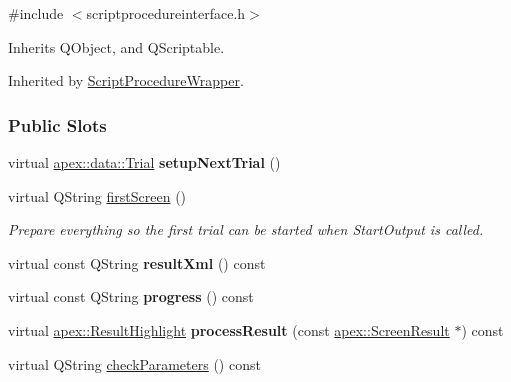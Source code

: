 \hypertarget{class_script_procedure_interface}{
\label{class_script_procedure_interface}
}


{\ttfamily \#include $<$scriptprocedureinterface.\-h$>$}



Inherits Q\-Object, and Q\-Scriptable.



Inherited by \hyperlink{class_script_procedure_wrapper}{Script\-Procedure\-Wrapper}.

\subsubsection*{Public Slots}
\begin{DoxyCompactItemize}
\item
\hypertarget{class_script_procedure_interface_a4ca453f099ab55982c037abeadd49355}{virtual \hyperlink{classapex_1_1data_1_1_trial}{apex\-::data\-::\-Trial} {\bfseries setup\-Next\-Trial} ()}\label{class_script_procedure_interface_a4ca453f099ab55982c037abeadd49355}

\item
\hypertarget{class_script_procedure_interface_a3a44eaccef2c1d99b476a3e1ad2b23eb}{virtual Q\-String \hyperlink{class_script_procedure_interface_a3a44eaccef2c1d99b476a3e1ad2b23eb}{first\-Screen} ()}\label{class_script_procedure_interface_a3a44eaccef2c1d99b476a3e1ad2b23eb}

\begin{DoxyCompactList}\small\item\em Prepare everything so the first trial can be started when Start\-Output is called. \end{DoxyCompactList}\item
\hypertarget{class_script_procedure_interface_ab78ee486c1c3ab76610f70832593e922}{virtual const Q\-String {\bfseries result\-Xml} () const }\label{class_script_procedure_interface_ab78ee486c1c3ab76610f70832593e922}

\item
\hypertarget{class_script_procedure_interface_aac674a916bcea3d40e2e6b7ef7ea5189}{virtual const Q\-String {\bfseries progress} () const }\label{class_script_procedure_interface_aac674a916bcea3d40e2e6b7ef7ea5189}

\item
\hypertarget{class_script_procedure_interface_a0da333a37d2aba7dbcb3902dc9ed89ed}{virtual \hyperlink{classapex_1_1_result_highlight}{apex\-::\-Result\-Highlight} {\bfseries process\-Result} (const \hyperlink{classapex_1_1_screen_result}{apex\-::\-Screen\-Result} $\ast$) const }\label{class_script_procedure_interface_a0da333a37d2aba7dbcb3902dc9ed89ed}

\item
virtual Q\-String \hyperlink{class_script_procedure_interface_ac6a06da223647faf20b8b2e8ef6360ed}{check\-Parameters} () const
\end{DoxyCompactItemize}
